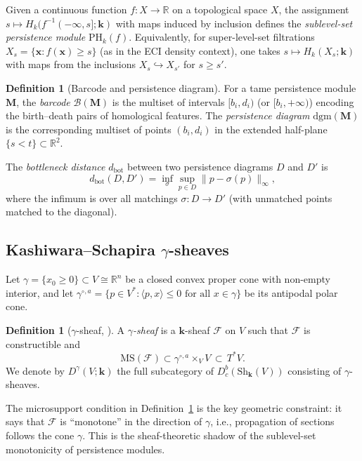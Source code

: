 \documentclass[12pt,a4paper]{amsart}
\theoremstyle{definition}
\newtheorem{definition}[theorem]{Definition}
\newcommand{\R}{\mathbb{R}}
\newcommand{\kk}{\mathbf{k}}                %
\newcommand{\Sh}{\mathrm{Sh}}               %
\newcommand{\Dbc}{D^b_c}                     %
\newcommand{\PHk}{\mathrm{PH}_k}            %
\newcommand{\MS}{\mathrm{MS}}               %
\newcommand{\dbot}{d_{\mathrm{bot}}}        %
\newcommand{\Dgamma}{D^\gamma}              %
\newcommand{\gammaop}{\gamma^{\circ,a}}     %
\begin{document}
Given a continuous function $f: X \to \R$ on a topological space $X$,
the assignment $s \mapsto H_k(f^{-1}(-\infty, s]; \kk)$ with maps
induced by inclusion defines the \emph{sublevel-set persistence module}
$\PHk(f)$.  Equivalently, for super-level-set filtrations
$X_s = \{\mathbf{x} : f(\mathbf{x}) \geq s\}$ (as in the ECI density
context), one takes $s \mapsto H_k(X_s; \kk)$ with maps from the
inclusions $X_s \hookrightarrow X_{s'}$ for $s \geq s'$.

\begin{definition}[Barcode and persistence diagram]
  \label{def:barcode}
  For a tame persistence module $\mathbf{M}$, the
  \emph{barcode} $\mathcal{B}(\mathbf{M})$ is the multiset of intervals
  $[b_i, d_i)$ (or $[b_i, +\infty)$) encoding the birth--death pairs of
  homological features.  The \emph{persistence diagram}
  $\mathrm{dgm}(\mathbf{M})$ is the corresponding multiset of points
  $(b_i, d_i)$ in the extended half-plane $\{s < t\} \subset \R^2$.
\end{definition}

The \emph{bottleneck distance} $\dbot$ between two persistence diagrams
$D$ and $D'$ is
\[
  \dbot(D, D') = \inf_{\sigma} \sup_{p \in D} \|p - \sigma(p)\|_\infty,
\]
where the infimum is over all matchings $\sigma: D \to D'$ (with
unmatched points matched to the diagonal).

\subsection{Kashiwara--Schapira \texorpdfstring{$\gamma$}{gamma}-sheaves}

Let $\gamma = \{x_0 \geq 0\} \subset V \cong \R^n$ be a closed convex
proper cone with non-empty interior, and let
$\gammaop = \{p \in V^* : \langle p, x \rangle \leq 0 \text{ for all }
x \in \gamma\}$ be its antipodal polar cone.

\begin{definition}[$\gamma$-sheaf, {\cite[Def.~3.1]{KS2018}}]
  \label{def:gamma-sheaf}
  A \emph{$\gamma$-sheaf} is a $\kk$-sheaf $\mathcal{F}$ on $V$ such
  that $\mathcal{F}$ is constructible and
  \[
    \MS(\mathcal{F}) \subset \gammaop \times_V V
    \,\subset\, T^*V.
  \]
  We denote by $\Dgamma(V;\kk)$ the full subcategory of
  $\Dbc(\Sh_\kk(V))$ consisting of $\gamma$-sheaves.
\end{definition}

The microsupport condition in Definition~\ref{def:gamma-sheaf} is the
key geometric constraint: it says that $\mathcal{F}$ is ``monotone'' in
the direction of $\gamma$, i.e., propagation of sections follows the
cone $\gamma$.  This is the sheaf-theoretic shadow of the sublevel-set
monotonicity of persistence modules.
\end{document}
